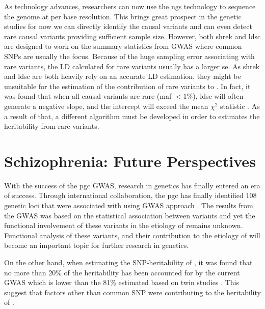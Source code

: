 \documentclass[12pt]{scrbook}
\newcommand*{\glng}{\glsentrylong}
\begin{document}
	As technology advances, researchers can now use the \gls{ngs} technology to sequence the genome at per base resolution. 
	This brings great prospect in the genetic studies for now we can directly identify the causal variants and can even detect rare causal variants providing sufficient sample size. 
	However, both \gls{shrek} and \gls{ldsc} are designed to work on the summary statistics from \gls{GWAS} where common \glspl{SNP} are usually the focus. 
	Because of the huge sampling error associating with rare variants, the \gls{LD} calculated for rare variants usually has a larger \gls{se}.
	As \gls{shrek} and \gls{ldsc} are both heavily rely on an accurate \gls{LD} estimation, they might be unsuitable for the estimation of the contribution of rare variants to \glng{scz}. 
	In fact, it was found that when all causal variants are rare (\gls{maf} $<1\%$), \gls{ldsc} will often generate a negative slope, and the intercept will exceed the mean $\chi^2$ statistic \citep{Bulik-Sullivan2015}.
	As a result of that, a different algorithm must be developed in order to estimates the heritability from rare variants.
	
	\section{Schizophrenia: Future Perspectives}
	With the success of the \gls{pgc} \glng{scz} \gls{GWAS}, research in \glng{scz} genetics has finally entered an era of success.
	Through international collaboration, the \gls{pgc} has finally identified 108 genetic loci that were associated with \glng{scz} using \gls{GWAS} approach \citep{Ripke2014}.
	The results from the \gls{GWAS} was based on the statistical association between variants and \glng{scz} yet the functional involvement of these variants in the etiology of \glng{scz} remains unknown.
	Functional analysis of these variants, and their contribution to the etiology of \glng{scz} will become an important topic for further research in \glng{scz} genetics.
	
	On the other hand, when estimating the \gls{SNP}-heritability of \glng{scz}, it was found that no more than 20\% of the heritability has been accounted for by the current \gls{GWAS} which is lower than the 81\% estimated based on twin studies \citep{Sullivan2003}. 
	This suggest that factors other than common \gls{SNP} were contributing to the heritability of \glng{scz}.
	
\end{document}
